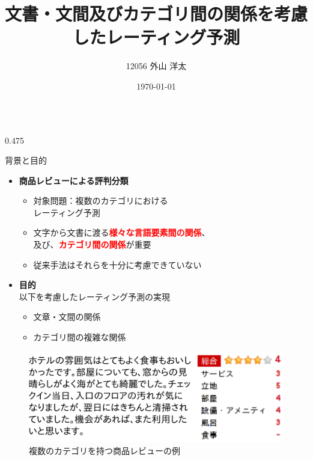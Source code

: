 \documentclass[unicode,10pt]{beamer}
\title{文書・文間及びカテゴリ間の関係を考慮したレーティング予測}
\institute{知能数理研究室}
\author{12056 外山 洋太}
\date{\today}
\newcommand{\itemtitle}[1]{\textbf{#1}\\}
\newcommand{\fire}[1]{\textcolor{red}{\textbf{#1}}}
\newcommand{\columnsize}{0.475\textwidth}
\begin{document}
\begin{frame}
\begin{columns}[onlytextwidth,t]

\begin{column}{\columnsize}
  \begin{block}{背景と目的}
    \begin{itemize}
      \item \itemtitle{商品レビューによる評判分類}
        \begin{itemize}
          \item 対象問題：複数のカテゴリにおける\\レーティング予測
          \item 文字から文書に渡る\fire{様々な言語要素間の関係}、\\
                及び、\fire{カテゴリ間の関係}が重要
          \item 従来手法はそれらを十分に考慮できていない
        \end{itemize}
      \item \itemtitle{目的}
        以下を考慮したレーティング予測の実現
        \begin{itemize}
          \item 文章・文間の関係
          \item カテゴリ間の複雑な関係
        \end{itemize}
    \end{itemize}
    \begin{figure}
      \includegraphics[width=0.9\linewidth]{fig/review.png}
      \caption{複数のカテゴリを持つ商品レビューの例}
    \end{figure}
  \end{block}


\end{column}
\end{columns}
\end{frame}
\end{document}
